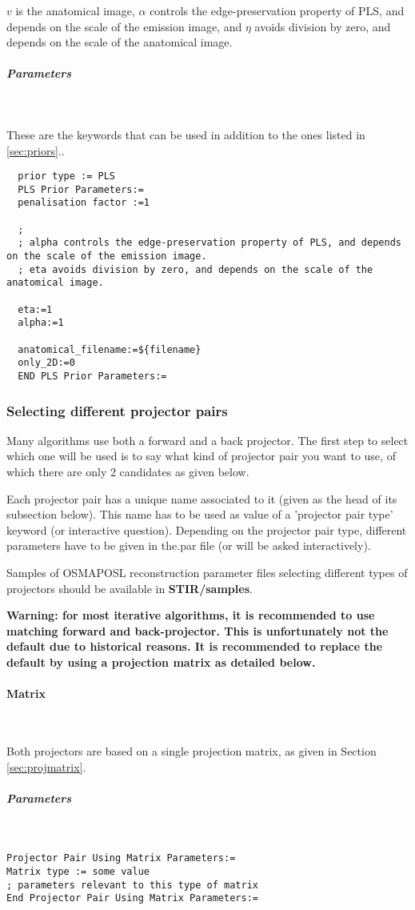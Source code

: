 \documentclass{article}
\newcommand{\subsubsubsection}[1]{\paragraph{#1}\mbox{} \\}
\newcommand{\subsubsubsubsection}[1]{\subparagraph{#1} \mbox{} \\}
\begin{document}
{{{  $ v $ is the anatomical image, $ \alpha $ controls the edge-preservation property of PLS, and depends on the scale of the emission image,
  and $ \eta $ avoids division by zero, and depends on the scale of the anatomical image. 
}
{ \subsubsubsubsection{Parameters}
}
  These are the keywords that can be used in addition to the ones listed in \ref{sec:priors}..
  \begin{verbatim}
  prior type := PLS
  PLS Prior Parameters:=
  penalisation factor :=1

  ; 
  ; alpha controls the edge-preservation property of PLS, and depends on the scale of the emission image. 
  ; eta avoids division by zero, and depends on the scale of the anatomical image. 

  eta:=1
  alpha:=1

  anatomical_filename:=${filename}
  only_2D:=0
  END PLS Prior Parameters:=
  \end{verbatim}

\subsubsection{
Selecting different projector pairs}
\label{sec:projectorpairs}
Many algorithms use both a forward and a back projector. The 
first step to select which one will be used is to say what kind 
of projector pair you want to use, of which there are only 2 
candidates as given below. 


Each projector pair has a unique name associated to it (given 
as the head of its subsection below). This name has to be used 
as value of a 'projector pair type' keyword (or interactive question). 
Depending on the projector pair type, different parameters have 
to be given in the.par file (or will be asked interactively).


Samples of OSMAPOSL reconstruction parameter files selecting 
different types of projectors should be available in \textbf{STIR/samples}.

\textbf{Warning: for most iterative algorithms, it is recommended 
to use matching forward and back-projector. This is unfortunately 
not the default due to historical reasons. It is recommended to replace
the default by using a projection matrix as detailed below.}

{ \subsubsubsection{Matrix}
}
\label{sec:projectorpairusingmatrix}
Both projectors are based on a single projection matrix, as given 
in Section \ref{sec:projmatrix}.

{ \subsubsubsubsection{Parameters}
}
\begin{verbatim}
Projector Pair Using Matrix Parameters:=
Matrix type := some value
; parameters relevant to this type of matrix
End Projector Pair Using Matrix Parameters:=
\end{verbatim}

}}
\end{document}
